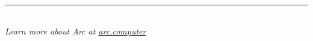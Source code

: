 \documentclass{article}
\begin{document}



\clearpage


\vspace{0.5cm}
\begin{center}
\rule{0.5\textwidth}{0.5pt}
\vspace{0.5cm}

\\ \vspace{0.3cm}
\textit{Learn more about Arc at \href{https://arc.computer}{arc.computer}}
\end{center}
\end{document}
